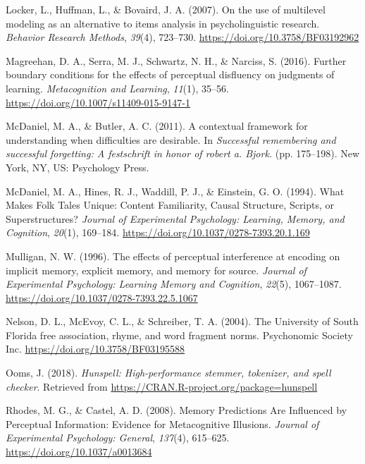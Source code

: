 \documentclass[english,pdf]{apa6}
\begin{document}
\leavevmode\hypertarget{ref-Locker2007}{}%
Locker, L., Huffman, L., \& Bovaird, J. A. (2007). On the use of multilevel modeling as an alternative to items analysis in psycholinguistic research. \emph{Behavior Research Methods}, \emph{39}(4), 723--730. \url{https://doi.org/10.3758/BF03192962}

\leavevmode\hypertarget{ref-Magreehan2016}{}%
Magreehan, D. A., Serra, M. J., Schwartz, N. H., \& Narciss, S. (2016). Further boundary conditions for the effects of perceptual disfluency on judgments of learning. \emph{Metacognition and Learning}, \emph{11}(1), 35--56. \url{https://doi.org/10.1007/s11409-015-9147-1}

\leavevmode\hypertarget{ref-McDaniel2011}{}%
McDaniel, M. A., \& Butler, A. C. (2011). A contextual framework for understanding when difficulties are desirable. In \emph{Successful remembering and successful forgetting: A festschrift in honor of robert a. Bjork.} (pp. 175--198). New York, NY, US: Psychology Press.

\leavevmode\hypertarget{ref-McDaniel1994}{}%
McDaniel, M. A., Hines, R. J., Waddill, P. J., \& Einstein, G. O. (1994). What Makes Folk Tales Unique: Content Familiarity, Causal Structure, Scripts, or Superstructures? \emph{Journal of Experimental Psychology: Learning, Memory, and Cognition}, \emph{20}(1), 169--184. \url{https://doi.org/10.1037/0278-7393.20.1.169}

\leavevmode\hypertarget{ref-Mulligan1996}{}%
Mulligan, N. W. (1996). The effects of perceptual interference at encoding on implicit memory, explicit memory, and memory for source. \emph{Journal of Experimental Psychology: Learning Memory and Cognition}, \emph{22}(5), 1067--1087. \url{https://doi.org/10.1037/0278-7393.22.5.1067}

\leavevmode\hypertarget{ref-Nelson2004}{}%
Nelson, D. L., McEvoy, C. L., \& Schreiber, T. A. (2004). The University of South Florida free association, rhyme, and word fragment norms. Psychonomic Society Inc. \url{https://doi.org/10.3758/BF03195588}

\leavevmode\hypertarget{ref-Ooms2018}{}%
Ooms, J. (2018). \emph{Hunspell: High-performance stemmer, tokenizer, and spell checker}. Retrieved from \url{https://CRAN.R-project.org/package=hunspell}

\leavevmode\hypertarget{ref-Rhodes2008}{}%
Rhodes, M. G., \& Castel, A. D. (2008). Memory Predictions Are Influenced by Perceptual Information: Evidence for Metacognitive Illusions. \emph{Journal of Experimental Psychology: General}, \emph{137}(4), 615--625. \url{https://doi.org/10.1037/a0013684}
\end{document}
